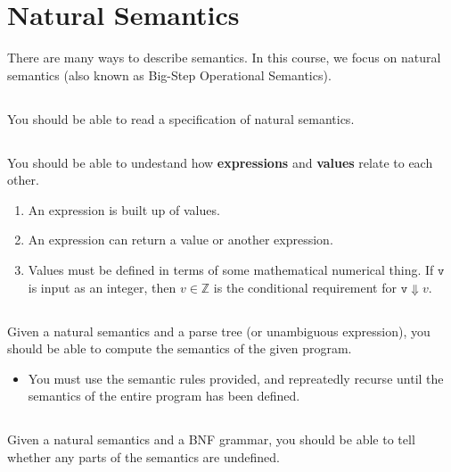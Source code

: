 \section{Natural Semantics}\label{sec:Natural_Semantics}
There are many ways to describe semantics.
In this course, we focus on natural semantics (also known as Big-Step Operational Semantics).

\subsection{}
You should be able to read a specification of natural semantics.

\subsection{}
You should be able to undestand how \textbf{expressions} and \textbf{values} relate to each other.

\begin{enumerate}[noitemsep]
\item An expression is built up of values.
\item An expression can return a value or another expression.
\item Values must be defined in terms of some mathematical numerical thing. If $\mathtt{v}$ is input as an integer, then $v \in \mathbb{Z}$ is the conditional requirement for $\mathtt{v} \Downarrow v$.
\end{enumerate}

\subsection{}
Given a natural semantics and a parse tree (or unambiguous expression), you should be able to compute the semantics of the given program.

\begin{itemize}[noitemsep]
\item You must use the semantic rules provided, and repreatedly recurse until the semantics of the entire program has been defined.
\end{itemize}

\subsection{}
Given a natural semantics and a BNF grammar, you should be able to tell whether any parts of the semantics are undefined.

